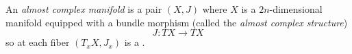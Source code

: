 
 
 
An \emph{almost complex manifold} is a pair $(X,J)$ where $X$ is a $2n$-dimensional manifold equipped with a bundle morphism (called the \emph{almost complex structure})
\[J: TX\to TX\]
so at each fiber $(T_xX, J_x)$ is a .

 